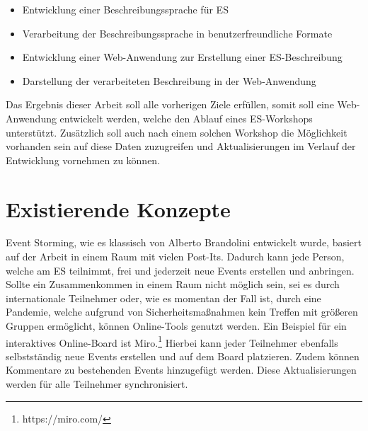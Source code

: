 \begin{itemize}
    \item Entwicklung einer Beschreibungssprache für \ac{ES}
    \item Verarbeitung der Beschreibungssprache in benutzerfreundliche Formate
    \item Entwicklung einer Web-Anwendung zur Erstellung einer \ac{ES}-Beschreibung
    \item Darstellung der verarbeiteten Beschreibung in der Web-Anwendung
\end{itemize}

Das Ergebnis dieser Arbeit soll alle vorherigen Ziele erfüllen, somit soll eine Web-Anwendung entwickelt werden,
welche den Ablauf eines \ac{ES}-Workshops unterstützt.
Zusätzlich soll auch nach einem solchen Workshop die Möglichkeit vorhanden sein auf diese Daten zuzugreifen und Aktualisierungen
im Verlauf der Entwicklung vornehmen zu können.


\section{Existierende Konzepte}\label{sec:existierende-konzepte}
Event Storming, wie es klassisch von Alberto Brandolini entwickelt wurde, basiert auf der Arbeit in einem Raum mit vielen Post-Its.
Dadurch kann jede Person, welche am \ac{ES} teilnimmt, frei und jederzeit neue Events erstellen und anbringen.
Sollte ein Zusammenkommen in einem Raum nicht möglich sein, sei es durch internationale Teilnehmer oder, wie es momentan der Fall ist,
durch eine Pandemie, welche aufgrund von Sicherheitsmaßnahmen kein Treffen mit größeren Gruppen ermöglicht, können Online-Tools genutzt werden.
Ein Beispiel für ein interaktives Online-Board ist Miro.\footnote{https://miro.com/}
Hierbei kann jeder Teilnehmer ebenfalls selbstständig neue Events erstellen und auf dem Board platzieren.
Zudem können Kommentare zu bestehenden Events hinzugefügt werden.
Diese Aktualisierungen werden für alle Teilnehmer synchronisiert.


